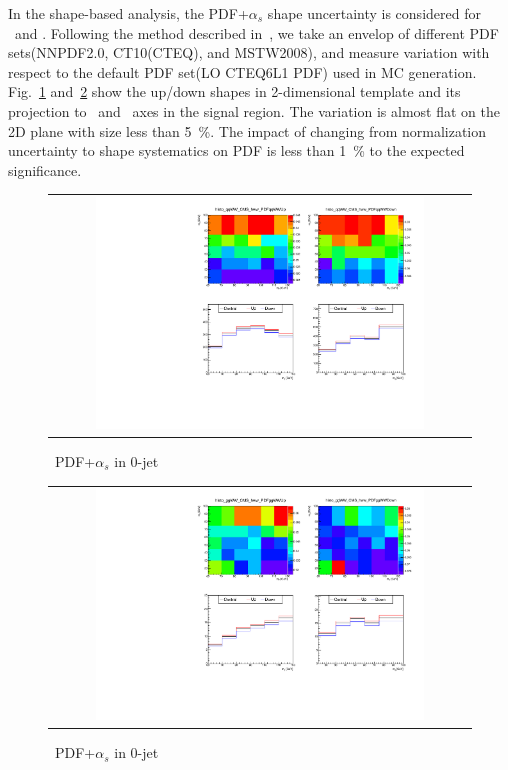 In the shape-based analysis, the PDF+$\alpha_s$ shape uncertainty is considered for \qqww\ and \ggww.  
Following the method described in~\cite{pdfAN}, we take an envelop of different PDF 
sets(NNPDF2.0, CT10(CTEQ), and MSTW2008), and measure variation with respect to the default 
PDF set(LO CTEQ6L1 PDF) used in MC generation. 
Fig.~\ref{fig:alter_pdfqqww} and~\ref{fig:alter_pdfggww} show the up/down 
shapes in 2-dimensional template and its projection to \mT\ and \mll\ axes
in the signal region. 
The variation is almost flat on the 2D plane with size less than 5~\%. 
The impact of changing from normalization uncertainty to shape systematics on PDF is less than 
1~\% to the expected significance.
%
\begin{figure}[htp] 
\centering 
\begin{tabular}{c} 
\includegraphics[width=0.8\textwidth]{figures/histo_qqWW_CMS_hww_PDFqqWW_0j_zoom.pdf} 
\end{tabular} 
\caption{ \qqww\ PDF+$\alpha_s$ in 0-jet}
\label{fig:alter_pdfqqww} 
\end{figure} 
%
\begin{figure}[htp] 
\centering 
\begin{tabular}{c} 
\includegraphics[width=0.8\textwidth]{figures/histo_ggWW_CMS_hww_PDFggWW_0j_zoom.pdf} 
\end{tabular} 
\caption{ \ggww\ PDF+$\alpha_s$ in 0-jet}
\label{fig:alter_pdfggww} 
\end{figure} 

